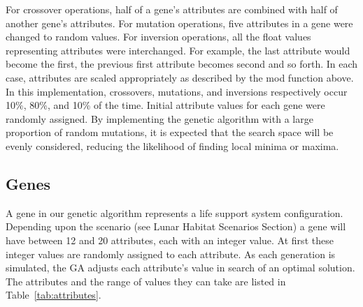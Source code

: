\documentclass[submit]{aiaa}
\begin{document}
For crossover operations, half of a gene's attributes are combined with half of another gene's attributes.  
For mutation operations, five attributes in a gene were changed to random values.  
For inversion operations, all the float values representing attributes were interchanged.
For example, the last attribute would become the first, the previous first attribute becomes second and so forth.
In each case, attributes are scaled appropriately as described by the mod function above.
In this implementation, crossovers, mutations, and inversions respectively occur 10\%, 80\%, and 10\% of the time.
Initial attribute values for each gene were randomly assigned.
By implementing the genetic algorithm with a large proportion of random mutations, it is expected that the search space will be evenly considered, reducing the likelihood of finding local minima or maxima.

\subsection{Genes}
\label{sec:gene}

A gene in our genetic algorithm represents a life support system configuration.
Depending upon the scenario (see Lunar Habitat Scenarios Section) %
 a gene will have between 12 and 20 attributes, each with an integer value.  
At first these integer values are randomly assigned to each attribute.  
As each generation is simulated, the GA adjusts each attribute's value in search of an optimal solution.  
The attributes and the range of values they can take are listed in Table~\ref{tab:attributes}.
\end{document}
